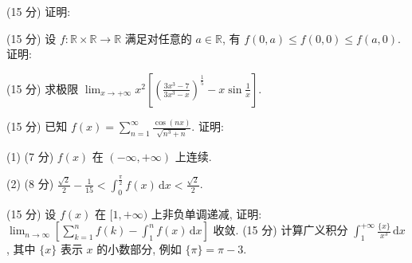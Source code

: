 \par{}
\par{}
(15 分) 证明:\par
\nopagebreak[4]
\par{}
\par{}
(15 分) 设 $f: \mathbb{R} \times \mathbb{R} \to \mathbb{R}$ 满足对任意的 $a \in \mathbb{R}$, 有 $f(0, a) \leq f(0, 0) \leq f(a, 0)$. 证明:\par
\nopagebreak[4]
\par{}
(15 分) 求极限 $\lim_{x\to +\infty}x^2\left[\left(\frac{3x^3 - 7}{3x^3 - x}\right)^{\frac{1}{5}} - x\sin \frac{1}{x}\right].$\par
\par{}
(15 分) 已知 $f(x) = \sum_{n=1}^{\infty} \frac{\cos(nx)}{\sqrt{n^3 + n}}$. 证明:\par
(1) (7 分) $f(x)$ 在 $(- \infty, + \infty)$ 上连续.\par
(2) (8 分) $\frac{\sqrt{2}}{2} - \frac{1}{15} < \int_{0}^{\frac{\pi}{2}} f(x) \, \mathrm{d}x < \frac{\sqrt{2}}{2}$.\par
\par{}
\par{}
(15 分) 设 $f(x)$ 在 $[1, +\infty)$ 上非负单调递减, 证明: $\lim_{n \to \infty} \left[ \sum_{k=1}^{n} f(k) - \int_{1}^{n} f(x) \, \mathrm{d}x \right]$ 收敛.
(15 分) 计算广义积分 $\int_{1}^{+\infty} \frac{\{x\}}{x^3} \, \mathrm{d}x$, 其中 $\{x\}$ 表示 $x$ 的小数部分, 例如 $\{\pi\} = \pi - 3$.
